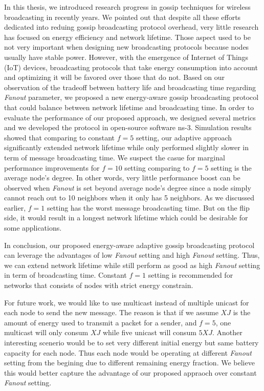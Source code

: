 \documentclass[onehalf,11pt]{beavtex}
\begin{document}
In this thesis, we introduced research progress in gossip techniques for wireless broadcasting in recently years. We pointed out that despite all these efforts dedicated into reduing gossip broadcasting protocol overhead, very little research has focused on energy efficiency and network lifetime. Those aspect used to be not very important when designing new broadcasting protocols because nodes usually have stable power. However, with the emergence of Internet of Things (IoT) devices, broadcasting protocols that take energy consumption  into account and optimizing it will be favored over those that do not. Based on our observation of the tradeoff between battery life and broadcasting time regarding \emph{Fanout} parameter, we proposed a new energy-aware gossip broadcasting protocol that could balance between network lifetime and broadcasting time. In order to evaluate the performance of our proposed approach, we designed several metrics and we developed the protocol in open-source software ns-3. Simulation results showed that comparing to constant $f=5$ setting, our adaptive approach significantly extended network lifetime while only performed slightly slower in term of message broadcasting time. We suspect the casue for marginal performance improvements for $f=10$ setting comparing to $f=5$ setting is the average node's degree. In other words, very little performance boost can be observed when \emph{Fanout} is set beyond average node's degree since a node simply cannot reach out to 10 neighbors when it only has 5 neighbors. As we discussed earlier, $f=1$ setting has the worst message broadcasting time. But on the flip side, it would result in a longest network lifetime which could be desirable for some applications. 

In conclusion, our proposed energy-aware adaptive gossip broadcasting protocol can leverage the advantages of low \emph{Fanout} setting and high \emph{Fanout} setting. Thus, we can extend network lifetime while still perform as good as high \emph{Fanout} setting in term of broadcasting time. Constant $f=1$ setting is recommended for networks that consists of nodes with strict energy constrain. 

For future work, we would like to use multicast instead of multiple unicast for each node to send the new message. The reason is that if we assume $X J$ is the amount of energy used to transmit a packet for a sender, and $f=5$, one multicast will only consum $X J$ while five unicast will consum $5X J$. Another interesting scenerio would be to set very different initial energy but same battery capacity for each node. Thus each node would be operating at different \emph{Fanout} setting from the begining due to different remaining energy fraction. We believe this would better capture the advantage of our proposed appraoch over constant \emph{Fanout} setting.
\end{document}
